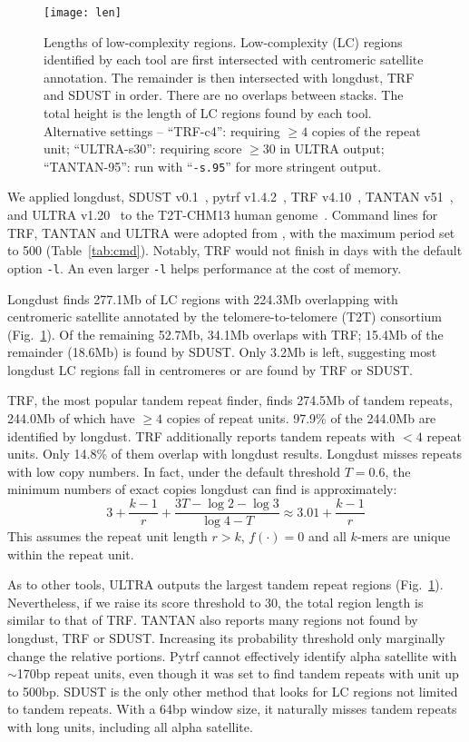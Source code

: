 \documentclass[webpdf,contemporary,large,namedate]{oup-authoring-template}%
\begin{document}
\begin{figure}[tb]
\texttt{[image: len]}
\caption{Lengths of low-complexity regions.
Low-complexity (LC) regions identified by each tool are first intersected with centromeric satellite annotation.
The remainder is then intersected with longdust, TRF and SDUST in order.
There are no overlaps between stacks.
The total height is the length of LC regions found by each tool.
Alternative settings --
``TRF-c4'': requiring $\ge4$ copies of the repeat unit;
``ULTRA-s30'': requiring score $\ge30$ in ULTRA output;
``TANTAN-95'': run with ``{\tt -s.95}'' for more stringent output.
}\label{fig:len}
\end{figure}

We applied longdust, SDUST v0.1~\citep{Morgulis:2006aa},
pytrf v1.4.2~\citep{Du:2025aa},
TRF v4.10~\citep{Benson:1999aa},
TANTAN v51~\citep{Frith:2011aa},
and ULTRA v1.20~\citep{Olson:2024aa}
to the T2T-CHM13 human genome~\citep{Nurk:2022up}.
Command lines for TRF, TANTAN and ULTRA were adopted from \citet{Olson:2024aa},
with the maximum period set to 500 (Table~\ref{tab:cmd}).
Notably, TRF would not finish in days with the default option {\tt -l}.
An even larger {\tt -l} helps performance at the cost of memory.

Longdust finds 277.1Mb of LC regions with 224.3Mb overlapping with centromeric satellite annotated by the telomere-to-telomere (T2T) consortium (Fig.~\ref{fig:len}).
Of the remaining 52.7Mb, 34.1Mb overlaps with TRF; 15.4Mb of the remainder (18.6Mb) is found by SDUST.
Only 3.2Mb is left, suggesting most longdust LC regions fall in centromeres or are found by TRF or SDUST.

TRF, the most popular tandem repeat finder, finds 274.5Mb of tandem repeats,
244.0Mb of which have $\ge4$ copies of repeat units.
97.9\% of the 244.0Mb are identified by longdust.
TRF additionally reports tandem repeats with $<4$ repeat units.
Only 14.8\% of them overlap with longdust results.
Longdust misses repeats with low copy numbers.
In fact, under the default threshold $T=0.6$,
the minimum numbers of exact copies longdust can find is approximately:
$$
3+\frac{k-1}{r}+\frac{3T-\log2-\log3}{\log4-T}\approx3.01+\frac{k-1}{r}
$$
This assumes the repeat unit length $r>k$, $f(\cdot)=0$ and all $k$-mers are unique within the repeat unit.

As to other tools, ULTRA outputs the largest tandem repeat regions (Fig.~\ref{fig:len}).
Nevertheless, if we raise its score threshold to 30,
the total region length is similar to that of TRF.
TANTAN also reports many regions not found by longdust, TRF or SDUST.
Increasing its probability threshold only marginally change the relative portions.
Pytrf cannot effectively identify alpha satellite with $\sim$170bp repeat units,
even though it was set to find tandem repeats with unit up to 500bp.
SDUST is the only other method that looks for LC regions not limited to tandem repeats.
With a 64bp window size, it naturally misses tandem repeats with long units, including all alpha satellite.
\end{document}
